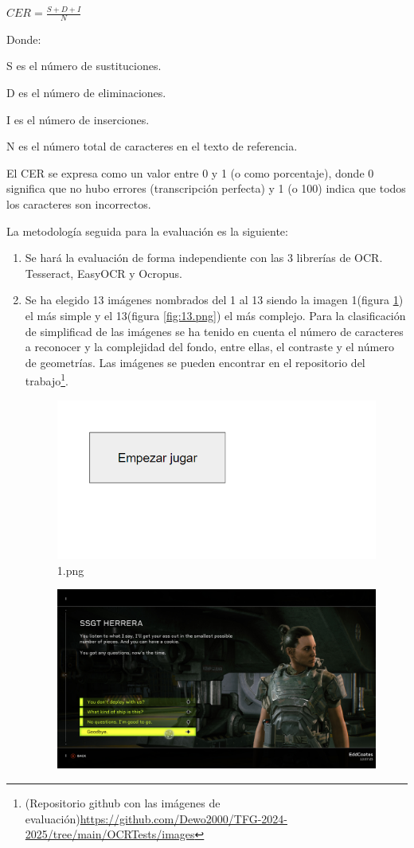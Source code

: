 	$CER = \frac{S+D+I}{N} $ 

Donde:

S es el número de sustituciones.

D es el número de eliminaciones.

I es el número de inserciones.

N es el número total de caracteres en el texto de referencia.

El CER se expresa como un valor entre 0 y 1 (o como porcentaje), donde 0 significa que no hubo errores (transcripción perfecta) y 1 (o 100) indica que todos los caracteres son incorrectos.

La metodología seguida para la evaluación es la siguiente:

\begin{enumerate}
	\item Se hará la evaluación de forma independiente con las 3 librerías de OCR. Tesseract, EasyOCR y Ocropus.
	\item Se ha elegido 13 imágenes nombrados del 1 al 13 siendo la imagen 1(figura \ref{fig:1.png}) el más simple y el 13(figura \ref{fig:13.png}) el más complejo. Para la clasificación de simplificad de las imágenes se ha tenido en cuenta el número de caracteres a reconocer y la complejidad del fondo, entre ellas, el contraste y el número de geometrías.
	Las imágenes se pueden encontrar en el repositorio del trabajo\footnote{(Repositorio github con las imágenes de evaluación)\url{https://github.com/Dewo2000/TFG-2024-2025/tree/main/OCRTests/images}}.
		\begin{figure}[H]
		\centering
		\includegraphics[width = 1\textwidth]{Imagenes/Evaluacion_OCR/1.png}
		\caption{1.png}
		\label{fig:1.png}
	\end{figure}
		\begin{figure}[H]
		\centering
		\includegraphics[width = 1\textwidth]{Imagenes/Evaluacion_OCR/13.png}

\end{figure}
\end{enumerate}

